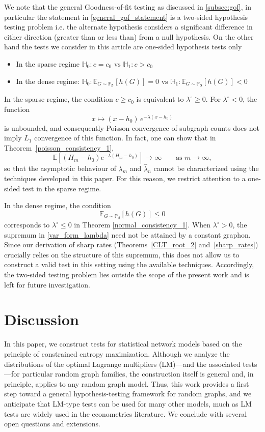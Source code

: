 \documentclass[12pt]{article}
\def\H{\mathbb{H}}
\numberwithin{equation}{section}
\def\bbeta{\boldsymbol{\beta}}
\begin{document}
We note that the general Goodness-of-fit testing as discussed in \ref{subsec:gof}, in particular the statement in \eqref{general_gof_statement} is a two-sided hypothesis testing problem i.e. the alternate hypothesis considers a significant difference in either direction (greater than or less than) from a null hypothesis. On the other hand the tests we consider in this article are one-sided hypothesis tests only 
\begin{itemize}
    \item In the sparse regime $
\H_0: c=c_0 \text{ vs } \H_1: c>c_0$
\item In the dense regime: $\H_0: \mathbb{E}_{G\sim\mathbb{P}_{\bbeta}}[h(G)]=0 \text{ vs } \H_1: \mathbb{E}_{G\sim\mathbb{P}_{\bbeta}}[h(G)]< 0 $
\end{itemize}
In the sparse regime, the condition $c \geq c_0$ is equivalent to
$\lambda^{\circ} \geq 0$.
For $\lambda^{\circ} < 0$, the function
\[
x \longmapsto (x - h_0)\, e^{-\lambda (x - h_0)}
\]
is unbounded, and consequently Poisson convergence of subgraph counts does not
imply $L_1$ convergence of this function.
In fact, one can show that in Theorem~\ref{poisson_consistency_1},
\[
\mathbb{E}\!\left[(H_m - h_0)e^{-\lambda (H_m - h_0)}\right]
\to \infty \qquad \text{as } m \to \infty,
\]
so that the asymptotic behaviour of $\lambda_m$ and $\hat{\lambda}_n$ cannot be
characterized using the techniques developed in this paper.
For this reason, we restrict attention to a one-sided test in the sparse regime.

In the dense regime, the condition
\[
\mathbb{E}_{G\sim\mathbb{P}_{\beta}}[h(G)] \leq 0
\]
corresponds to $\lambda^{\circ} \leq 0$ in Theorem \ref{normal_consistency_1}.
When $\lambda^{\circ} > 0$, the supremum in \eqref{var_form_lambda} need not be
attained by a constant graphon.
Since our derivation of sharp rates (Theorems~\ref{CLT_root_2}
and~\ref{sharp_rates}) crucially relies on the structure of this supremum, this does not allow us to construct a valid test in this setting using the available techniques.
Accordingly, the two-sided testing problem lies outside the scope of the present
work and is left for future investigation.




\section{Discussion \label{discussion}}

In this paper, we construct tests for statistical network models based on the principle of constrained entropy maximization. Although we analyze the distributions of the optimal Lagrange multipliers (LM)—and the associated tests—for particular random graph families, the construction itself is general and, in principle, applies to any random graph model. Thus, this work provides a first step toward a general hypothesis-testing framework for random graphs, and we anticipate that LM-type tests can be used for many other models, much as LM tests are widely used in the econometrics literature. We conclude with several open questions and extensions.
\end{document}
